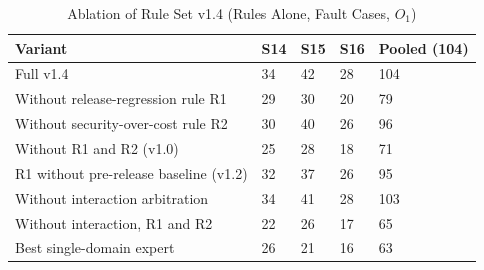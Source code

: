 \begin{table}[!t]
\caption{Ablation of Rule Set v1.4 (Rules Alone, Fault Cases, $O_1$)}
\label{tab:ablation}
\centering\footnotesize
\begin{tabular}{L{3.35cm}L{0.7cm}L{0.7cm}L{0.7cm}L{1.1cm}}
\toprule
\textbf{Variant} & \textbf{S14} & \textbf{S15} & \textbf{S16} & \textbf{Pooled (104)} \\
\midrule
Full v1.4 & 34 & 42 & 28 & 104 \\
Without release-regression rule R1 & 29 & 30 & 20 & 79 \\
Without security-over-cost rule R2 & 30 & 40 & 26 & 96 \\
Without R1 and R2 (v1.0) & 25 & 28 & 18 & 71 \\
R1 without pre-release baseline (v1.2) & 32 & 37 & 26 & 95 \\
Without interaction arbitration & 34 & 41 & 28 & 103 \\
Without interaction, R1 and R2 & 22 & 26 & 17 & 65 \\
Best single-domain expert & 26 & 21 & 16 & 63 \\
\bottomrule
\end{tabular}
\end{table}
